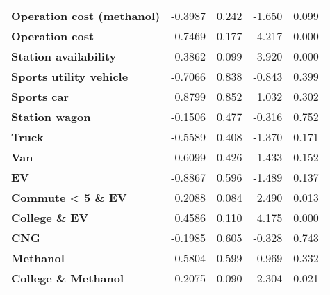 \begin{tabular}{lrrrr}
\textbf{Operation cost (methanol)}                               &      -0.3987  &        0.242     &    -1.650  &         0.099        \\
\textbf{Operation cost}                                          &      -0.7469  &        0.177     &    -4.217  &         0.000        \\
\textbf{Station availability}                                    &       0.3862  &        0.099     &     3.920  &         0.000        \\
\textbf{Sports utility vehicle}                                  &      -0.7066  &        0.838     &    -0.843  &         0.399        \\
\textbf{Sports car}                                              &       0.8799  &        0.852     &     1.032  &         0.302        \\
\textbf{Station wagon}                                           &      -0.1506  &        0.477     &    -0.316  &         0.752        \\
\textbf{Truck}                                                   &      -0.5589  &        0.408     &    -1.370  &         0.171        \\
\textbf{Van}                                                     &      -0.6099  &        0.426     &    -1.433  &         0.152        \\
\textbf{EV}                                                      &      -0.8867  &        0.596     &    -1.489  &         0.137        \\
\textbf{Commute < 5 \& EV}                                       &       0.2088  &        0.084     &     2.490  &         0.013        \\
\textbf{College \& EV}                                           &       0.4586  &        0.110     &     4.175  &         0.000        \\
\textbf{CNG}                                                     &      -0.1985  &        0.605     &    -0.328  &         0.743        \\
\textbf{Methanol}                                                &      -0.5804  &        0.599     &    -0.969  &         0.332        \\
\textbf{College \& Methanol}                                     &       0.2075  &        0.090     &     2.304  &         0.021        \\

\bottomrule
\end{tabular}
